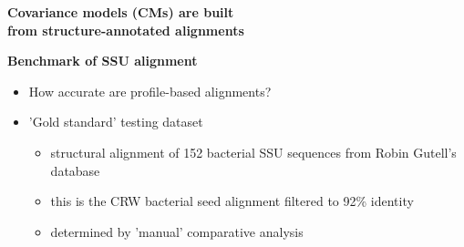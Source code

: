 \documentclass[landscape]{slides}
\begin{document}
\begin{slide}
\begin{center}
\textbf{Covariance models (CMs) are built \\ from structure-annotated alignments}
\end{center}
\medskip





\vfill

\end{slide}
\begin{slide}
\begin{center}
\textbf{Benchmark of SSU alignment}
\end{center}
\medskip

\small
\begin{itemize}
\item
How accurate are profile-based alignments?
\item
'Gold standard' testing dataset
\begin{itemize}
\item
structural alignment of 152 bacterial SSU sequences
from Robin Gutell's database
\item
this is the CRW bacterial seed alignment filtered to 92\% identity
\item
determined by 'manual' comparative analysis
\end{itemize}
\end{itemize}


\vfill
\end{slide}
\end{document}
